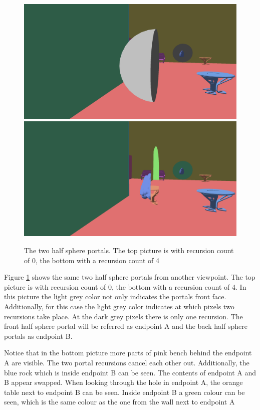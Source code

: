 \begin{figure}[H]
	\includegraphics[width=\linewidth]{images/NonPlanarR0.png}
	\includegraphics[width=\linewidth]{images/nonplanar.png}
	\caption{The two half sphere portals. The top picture is with recursion count of 0, the bottom with a recursion count of 4}
	\label{fig:nonplanar}
\end{figure}

Figure \ref{fig:nonplanar} shows the same two half sphere portals from another viewpoint. The top picture is with recursion count of 0, the bottom with a recursion count of 4. In this picture the light grey color not only indicates the portals front face. Additionally, for this case the light grey color indicates at which pixels two recursions take place. At the dark grey pixels there is only one recursion. The front half sphere portal will be referred as \gls{endpoint} A and the back half sphere portals as \gls{endpoint} B.

Notice that in the bottom picture more parts of pink bench behind the \gls{endpoint} A are visible. The two portal recursions cancel each other out. Additionally, the blue rock which is inside \gls{endpoint} B can be seen. The contents of \gls{endpoint} A and B appear swapped. When looking through the hole in \gls{endpoint} A, the orange table next to \gls{endpoint} B can be seen. Inside \gls{endpoint} B a green colour can be seen, which is the same colour as the one from the wall next to \gls{endpoint} A

